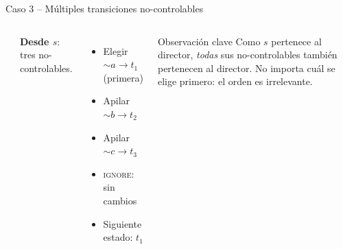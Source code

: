 \documentclass{beamer}
\begin{document}
\begin{frame}{Caso 3 -- M\'ultiples transiciones no-controlables}
\begin{columns}[c]
\begin{center}
\end{center}

\textbf{Desde $s$}: tres no-controlables.

\medskip
\begin{itemize}
  \item[\textcolor{cChosen}{$\blacktriangleright$}] Elegir ${\sim}a \to t_1$ (primera)
  \item[\textcolor{cStack}{$\blacktriangleright$}] Apilar ${\sim}b \to t_2$
  \item[\textcolor{cStack}{$\blacktriangleright$}] Apilar ${\sim}c \to t_3$
  \item \textsc{ignore}: sin cambios
  \item Siguiente estado: $t_1$
\end{itemize}

\medskip
\begin{block}{Observaci\'on clave}
Como $s$ pertenece al director, \emph{todas} sus no-controlables tambi\'en pertenecen al director. No importa cu\'al se elige primero: el orden es irrelevante.
\end{block}
\end{columns}
\end{frame}
\end{document}
